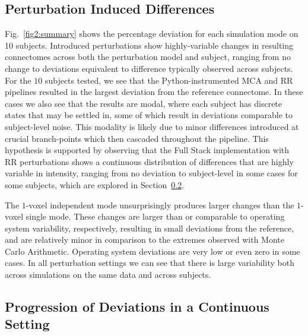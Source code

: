 \documentclass[fleqn,12pt]{SelfArx_ch} %
\begin{document}
\subsection{Perturbation Induced Differences}
Fig.~\ref{fig2:summary} shows the percentage deviation for each simulation mode on 10 subjects. Introduced
perturbations show highly-variable changes in resulting connectomes across both the perturbation model and subject,
ranging from no change to deviations equivalent to difference typically observed across subjects. For the $10$ subjects
tested, we see that the Python-instrumented MCA and RR pipelines resulted in the largest deviation from the reference
connectome. In these cases we also see that the results are modal, where each subject has discrete states that may be
settled in, some of which result in deviations comparable to subject-level noise. This modality is likely due to minor
differences introduced at crucial branch-points which then cascaded throughout the pipeline. This hypothesis is
supported by observing that the Full Stack implementation with RR perturbations shows a continuous distribution of
differences that are highly variable in intensity, ranging from no deviation to subject-level in some cases for some
subjects, which are explored in Section~\ref{sec:progdev}.

The $1$-voxel independent mode unsurprisingly produces larger changes than the $1$-voxel single mode. These changes are
larger than or comparable to operating system variability, respectively, resulting in small deviations from the
reference, and are relatively minor in comparison to the extremes observed with Monte Carlo Arithmetic. Operating
system deviations are very low or even zero in some cases. In all perturbation settings we can see that there is large
variability both across simulations on the same data and across subjects.

\subsection{Progression of Deviations in a Continuous Setting}
\label{sec:progdev}
\end{document}
